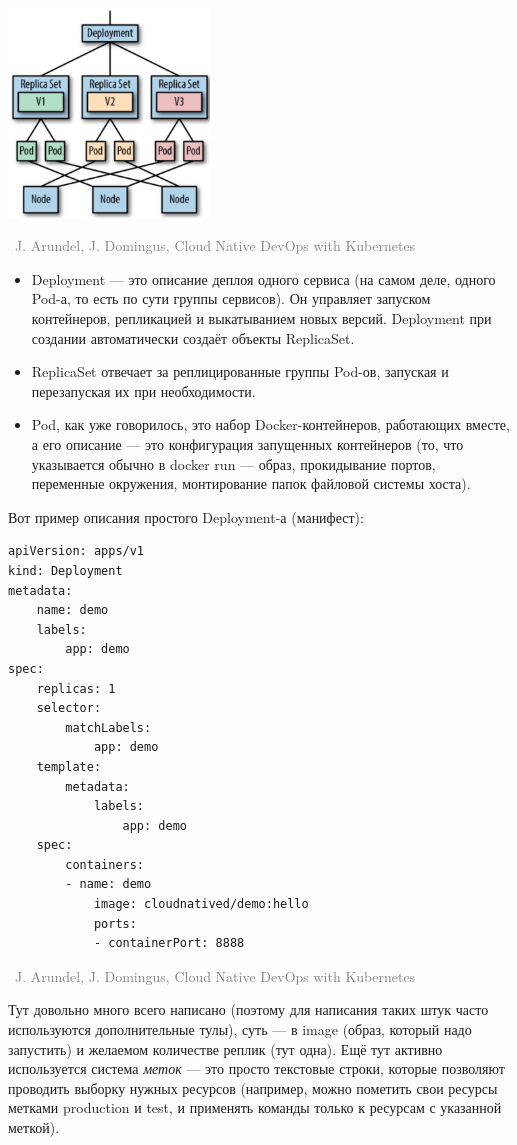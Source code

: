 \documentclass[a5paper]{article}
\newcommand{\attribution}[1] {
    \vspace{-5mm}\begin{flushright}\begin{scriptsize}\textcolor{gray}{\textcopyright\, #1}\end{scriptsize}\end{flushright}
}
\begin{document}
\begin{center}
    \includegraphics[width=0.4\textwidth]{kubernetesObjects.png}
    \attribution{J. Arundel, J. Domingus, Cloud Native DevOps with Kubernetes}
\end{center}

\begin{itemize}
    \item Deployment --- это описание деплоя одного сервиса (на самом деле, одного Pod-а, то есть по сути группы сервисов). Он управляет запуском контейнеров, репликацией и выкатыванием новых версий. Deployment при создании автоматически создаёт объекты ReplicaSet.
    \item ReplicaSet отвечает за реплицированные группы Pod-ов, запуская и перезапуская их при необходимости.
    \item Pod, как уже говорилось, это набор Docker-контейнеров, работающих вместе, а его описание --- это конфигурация запущенных контейнеров (то, что указывается обычно в docker run --- образ, прокидывание портов, переменные окружения, монтирование папок файловой системы хоста).
\end{itemize}

Вот пример описания простого Deployment-а (манифест):

\begin{verbatim}
apiVersion: apps/v1
kind: Deployment
metadata:
    name: demo
    labels:
        app: demo
spec:
    replicas: 1
    selector:
        matchLabels:
            app: demo
    template:
        metadata:
            labels:
                app: demo
    spec:
        containers:
        - name: demo
            image: cloudnatived/demo:hello
            ports:
            - containerPort: 8888
\end{verbatim}

\attribution{J. Arundel, J. Domingus, Cloud Native DevOps with Kubernetes}

Тут довольно много всего написано (поэтому для написания таких штук часто используются дополнительные тулы), суть --- в image (образ, который надо запустить) и желаемом количестве реплик (тут одна). Ещё тут активно используется система \emph{меток} --- это просто текстовые строки, которые позволяют проводить выборку нужных ресурсов (например, можно пометить свои ресурсы метками production и test, и применять команды только к ресурсам с указанной меткой).
\end{document}
